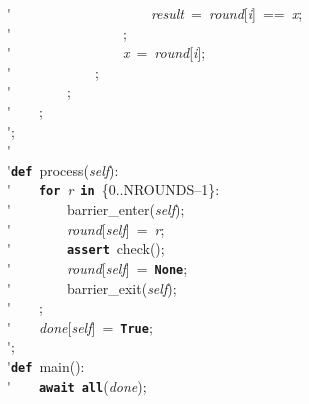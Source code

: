 \'\>~~~~~~~~~~~~~~~~~~~~\textit{result}~=~\textit{round}[\textit{i}]~==~\textit{x};\\

\'\>~~~~~~~~~~~~~~~~;\\

\'\>~~~~~~~~~~~~~~~~\textit{x}~=~\textit{round}[\textit{i}];\\

\'\>~~~~~~~~~~~~;\\

\'\>~~~~~~~~;\\

\'\>~~~~;\\

\'\>;\\

\'\>\\

\'\>\texttt{\textbf{def}}~process(\textit{self}):\\

\'\>~~~~\texttt{\textbf{for}}~\textit{r}~\texttt{\textbf{in}}~\{0..NROUNDS--1\}:\\

\'\>~~~~~~~~barrier\_enter(\textit{self});\\

\'\>~~~~~~~~\textit{round}[\textit{self}]~=~\textit{r};\\

\'\>~~~~~~~~\texttt{\textbf{assert}}~check();\\

\'\>~~~~~~~~\textit{round}[\textit{self}]~=~\texttt{\textbf{None}};\\

\'\>~~~~~~~~barrier\_exit(\textit{self});\\

\'\>~~~~;\\

\'\>~~~~\textit{done}[\textit{self}]~=~\texttt{\textbf{True}};\\

\'\>;\\

\'\>\texttt{\textbf{def}}~main():\\

\'\>~~~~\texttt{\textbf{await}}~\texttt{\textbf{all}}(\textit{done});\\

